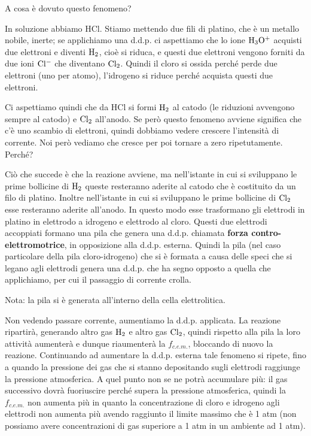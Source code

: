 \vspace{-0.5cm}A cosa è dovuto questo fenomeno?

In soluzione abbiamo HCl. Stiamo mettendo due fili di platino, che è un metallo nobile, inerte; se applichiamo una d.d.p. ci aspettiamo che lo ione $\rm H_3O^+$ acquisti due elettroni e diventi $\rm H_2$, cioè si riduca, e questi due elettroni vengono forniti da due ioni $\rm Cl^-$ che diventano $\rm Cl_2$. Quindi il cloro si ossida perché perde due elettroni (uno per atomo), l'idrogeno si riduce perché acquista questi due elettroni.

Ci aspettiamo quindi che da HCl si formi $\rm H_2$ al catodo (le riduzioni avvengono sempre al catodo) e $\rm Cl_2$ all'anodo. Se però questo fenomeno avviene significa che c'è uno scambio di elettroni, quindi dobbiamo vedere crescere l'intensità di corrente. Noi però vediamo che cresce per poi tornare a zero ripetutamente. Perché?

Ciò che succede è che la reazione avviene, ma nell'istante in cui si sviluppano le prime bollicine di $\rm H_2$ queste resteranno aderite al catodo che è costituito da un filo di platino. Inoltre nell'istante in cui si sviluppano le prime bollicine di $\rm Cl_2$ esse resteranno aderite all'anodo. In questo modo esse trasformano gli elettrodi in platino in elettrodo a idrogeno e elettrodo al cloro. Questi due elettrodi accoppiati formano una pila che genera una d.d.p. chiamata \textbf{forza contro-elettromotrice}, in opposizione alla d.d.p. esterna. Quindi la pila (nel caso particolare della pila cloro-idrogeno) che si è formata a causa delle speci che si legano agli elettrodi genera una d.d.p. che ha segno opposto a quella che applichiamo, per cui il passaggio di corrente crolla.

Nota: la pila si è generata all'interno della cella elettrolitica.

Non vedendo passare corrente, aumentiamo la d.d.p. applicata. La reazione ripartirà, generando altro gas $\rm H_2$ e altro gas $\rm Cl_2$, quindi rispetto alla pila la loro attività aumenterà e dunque riaumenterà la $f_{c.e.m.}$, bloccando di nuovo la reazione. Continuando ad aumentare la d.d.p. esterna tale fenomeno si ripete, fino a quando la pressione dei gas che si stanno depositando sugli elettrodi raggiunge la pressione atmosferica. A quel punto non se ne potrà accumulare più: il gas successivo dovrà fuoriuscire perché supera la pressione atmosferica, quindi la $f_{c.e.m.}$ non aumenta più in quanto la concentrazione di cloro e idrogeno agli elettrodi non aumenta più avendo raggiunto il limite massimo che è 1 atm (non possiamo avere concentrazioni di gas superiore a 1 atm in un ambiente ad 1 atm). 

